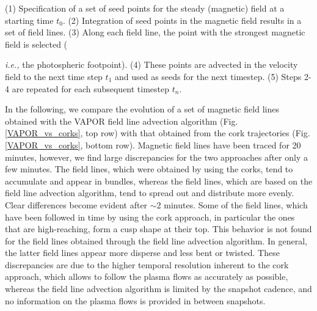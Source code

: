 \documentclass{aa}
\begin{document}
(1) Specification of a set of seed points for the steady (magnetic) field at a starting time $t_0$. (2) Integration of seed points in the magnetic field results in a set of field lines. (3) Along each field line, the point with the strongest magnetic field is selected ({\emph{i.e.,} the photospheric footpoint). (4) These points are advected in the velocity field to the next time step $t_1$ and used as seeds for the next timestep. (5) Steps 2-4 are repeated for each subsequent timestep $t_n$. 

In the following, we compare the evolution of a set of magnetic field lines obtained with the VAPOR field line advection algorithm (Fig. \ref{VAPOR_vs_corks}, top row) with that obtained from the cork trajectories (Fig. \ref{VAPOR_vs_corks}, bottom row). Magnetic field lines have been traced for 20 minutes, however, 
we find large discrepancies for the two approaches after only a few minutes. %
The field lines, which were obtained by using the corks, tend to accumulate and appear in bundles, whereas the field lines, which are based on the field line advection algorithm, tend to spread out and distribute more evenly. Clear differences become evident after $\sim$2 minutes.
Some of the field lines, which have been followed in time by using the cork approach, in particular the ones that are high-reaching, form a cusp shape at their top. This behavior is not found for the field lines obtained through the field line advection algorithm. In general, the latter field lines appear more disperse and less bent or twisted. These discrepancies are due to the higher temporal resolution inherent to the cork approach, which allows to follow the plasma flows as accurately as possible, whereas the field line advection algorithm is limited by the snapshot cadence, and no information on the plasma flows is provided in between snapshots.  %

}
\end{document}
